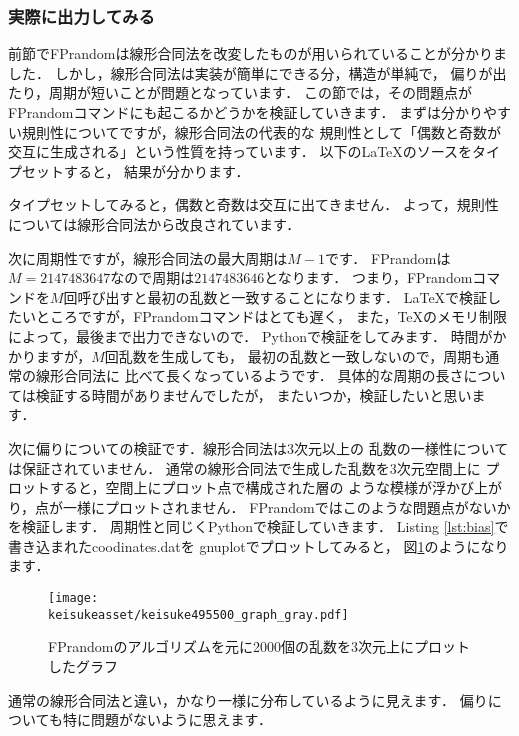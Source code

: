 \subsubsection{実際に出力してみる}
前節でFPrandomは線形合同法を改変したものが用いられていることが分かりました．
しかし，線形合同法は実装が簡単にできる分，構造が単純で，
偏りが出たり，周期が短いことが問題となっています．
この節では，その問題点がFPrandomコマンドにも起こるかどうかを検証していきます．
まずは分かりやすい規則性についてですが，線形合同法の代表的な
規則性として「偶数と奇数が交互に生成される」という性質を持っています．
以下の\LaTeX のソースをタイプセットすると，
結果が分かります．
タイプセットしてみると，偶数と奇数は交互に出てきません．
よって，規則性については線形合同法から改良されています．

次に周期性ですが，線形合同法の最大周期は$M-1$です．
FPrandomは$M=2147483647$なので周期は$2147483646$となります．
つまり，FPrandomコマンドを$M$回呼び出すと最初の乱数と一致することになります．
\LaTeX で検証したいところですが，FPrandomコマンドはとても遅く，
また，\TeX のメモリ制限によって，最後まで出力できないので．
Pythonで検証をしてみます．
{
}
{
}
時間がかかりますが，$M$回乱数を生成しても，
最初の乱数と一致しないので，周期も通常の線形合同法に
比べて長くなっているようです．
具体的な周期の長さについては検証する時間がありませんでしたが，
またいつか，検証したいと思います．

次に偏りについての検証です．線形合同法は3次元以上の
乱数の一様性については保証されていません．
通常の線形合同法で生成した乱数を3次元空間上に
プロットすると，空間上にプロット点で構成された層の
ような模様が浮かび上がり，点が一様にプロットされません．
FPrandomではこのような問題点がないかを検証します．
周期性と同じくPythonで検証していきます．
{
\label{lst:bias}
}
Listing \ref{lst:bias}で書き込まれたcoodinates.datを
gnuplotでプロットしてみると，
図\ref{fig:bias}のようになります．
\begin{figure}[htbp]
  \centering
  \texttt{[image: \\keisukeasset/keisuke495500\_graph\_gray.pdf]}
  \caption{FPrandomのアルゴリズムを元に2000個の乱数を3次元上にプロットしたグラフ}
  \label{fig:bias}
\end{figure}
通常の線形合同法と違い，かなり一様に分布しているように見えます．
偏りについても特に問題がないように思えます．

